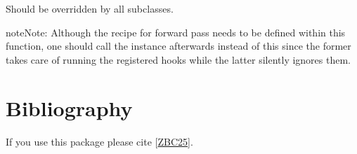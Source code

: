 \documentclass[letterpaper,10pt,english]{sphinxmanual}
\begin{document}
\begin{fulllineitems}
\begin{fulllineitems}
\sphinxAtStartPar
Should be overridden by all subclasses.

\begin{sphinxadmonition}{note}{Note:}
\sphinxAtStartPar
Although the recipe for forward pass needs to be defined within
this function, one should call the  instance afterwards
instead of this since the former takes care of running the
registered hooks while the latter silently ignores them.
\end{sphinxadmonition}

\end{fulllineitems}


\end{fulllineitems}


\sphinxstepscope


\chapter{Bibliography}
\label{\detokenize{biblio:bibliography}}\label{\detokenize{biblio::doc}}
\sphinxAtStartPar
If you use this package please cite {[}\hyperlink{cite.biblio:id7}{ZBC25}{]}.
\end{document}
